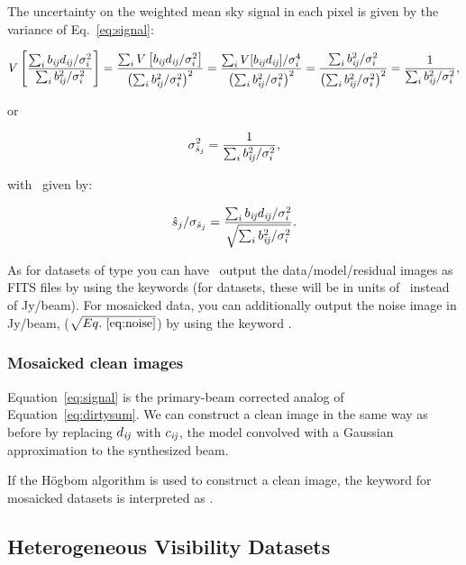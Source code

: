 The uncertainty on the weighted mean sky signal in each pixel is given
by the variance of Eq.~\ref{eq:signal}:

\begin{equation}
V\left[{{\sum_i{b_{{\it ij}}d_{{\it ij}}/\sigma^2_i}}\over{\sum_i{b^2_{{\it ij}}/\sigma^2_i}}}\right] = 
{{\sum_i{V\left[b_{{\it ij}}d_{{\it ij}}/\sigma^2_i\right]}}\over{\left(\sum_i{b^2_{{\it ij}}/\sigma^2_i}\right)^2}} =  
{{\sum_i{V[b_{{\it ij}}d_{{\it ij}}]/\sigma^4_i}}\over{\left(\sum_i{b^2_{{\it ij}}/\sigma^2_i}\right)^2}} =  
{{\sum_i{b^2_{{\it ij}}/\sigma^2_i}}\over{\left(\sum_i{b^2_{{\it ij}}/\sigma^2_i}\right)^2}} =  
{{1}\over{\sum_i{b^2_{{\it ij}}/\sigma^2_i}}},
\end{equation}

or 

\begin{equation}
\sigma^2_{\hat{s}_j} = {{1}\over{\sum_i{b^2_{{\it ij}}/\sigma^2_i}}},
\label{eq:noise}
\end{equation}

with \snr\ given by:

\begin{equation}
{\hat{s}_j}/\sigma_{\hat{s}_j} = {{\sum_i{b_{{\it ij}}d_{{\it ij}}/\sigma^2_i}}\over{\sqrt{\sum_i{b^2_{{\it ij}}/\sigma^2_{i}}}}}.
\label{eq:snr}
\end{equation}

As for datasets of type  you can have \climax\ output the
data/model/residual images as FITS files by using the
 keywords (for 
datasets, these will be in units of \snr\ instead of Jy/beam).  For
mosaicked data, you can additionally output the noise image in
Jy/beam, ($\sqrt{Eq.~\ref{eq:noise}}$) by using the keyword
.

\subsubsection{Mosaicked clean images}

Equation~\ref{eq:signal} is the primary-beam corrected analog of
Equation~\ref{eq:dirtysum}.  We can construct a clean image in the
same way as before by replacing $d_{{\it ij}}$ with $c_{{\it ij}}$, the model
convolved with a Gaussian approximation to the synthesized beam.

If the H{\"o}gbom algorithm is used to construct a clean image, the
keyword  for mosaicked datasets is interpreted as
\snr.

\subsection{Heterogeneous Visibility Datasets}

